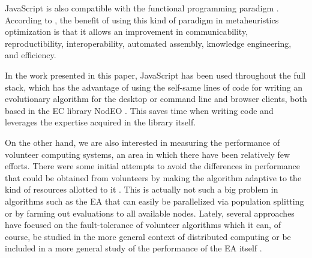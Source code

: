\documentclass[journal,onecolumn]{IEEEtran}
\begin{document}
JavaScript is also compatible with the functional programming paradigm \cite{Cousineau1998,MacLennan1990,Thompson1996}.
According to \cite{swanresearch2015}, the benefit of using this kind of paradigm in
metaheuristics optimization is that it allows an improvement in communicability,
reproductibility, interoperability, automated assembly, knowledge engineering,
and efficiency.

In the work presented in this paper, JavaScript has been used throughout the full
stack, which has the advantage of using the self-same lines of code for
writing an evolutionary algorithm for the
desktop or command line and browser clients, both based in the EC
library {\sf NodEO} \cite{DBLP:conf/gecco/GuervosVGES14}. This saves time 
when writing code and leverages 
the expertise acquired
 in the library itself. 

On the other hand, we are also interested in measuring the performance
of volunteer computing systems, an area in which there have been
relatively few efforts.
There were some initial attempts to avoid the differences in performance
that could be obtained from volunteers  by making
the algorithm adaptive to the kind of resources allotted to it
\cite{milani2004online}. This is actually not such a big problem in
algorithms such as the EA that can easily be
parallelized via population splitting or by farming out evaluations to all
available nodes. Lately, several approaches have focused on the
fault-tolerance of volunteer algorithms
\cite{gonzalez2010characterizing} which it can, of course, be studied in
the more general context of distributed computing 
\cite{nogueras2015studying} or be included in a more general study of the
performance of the EA itself
\cite{DBLP:journals/gpem/LaredoBGVAGF14}.
\end{document}
